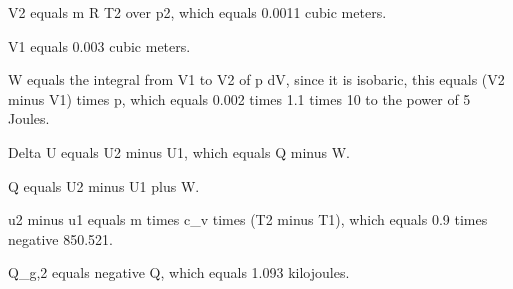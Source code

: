 V2 equals m R T2 over p2, which equals 0.0011 cubic meters.

V1 equals 0.003 cubic meters.

W equals the integral from V1 to V2 of p dV, since it is isobaric, this equals (V2 minus V1) times p, which equals 0.002 times 1.1 times 10 to the power of 5 Joules.

Delta U equals U2 minus U1, which equals Q minus W.

Q equals U2 minus U1 plus W.

u2 minus u1 equals m times c_v times (T2 minus T1), which equals 0.9 times negative 850.521.

Q_g,2 equals negative Q, which equals 1.093 kilojoules.